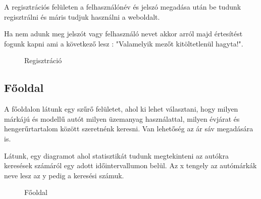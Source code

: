 A regisztrációs felületen a felhasználónév és jelszó megadása után be tudunk regisztrálni és máris tudjuk használni a weboldalt.

Ha nem adunk meg jelszót vagy felhasználó nevet akkor arról majd értesítést fogunk kapni ami a következő lesz : "Valamelyik mezőt kitöltetlenül hagyta!".

\begin{figure}[h]
\centering
{}
\caption{Regisztráció}
\label{fig:Regisztráció}
\end{figure}

\newpage
\subsection{Főoldal}

A főoldalon látunk egy szűrő felületet, ahol ki lehet választani, hogy milyen márkájú és modellű autót milyen üzemanyag használattal, milyen évjárat és hengerűrtartalom között szeretnénk keresni. Van lehetőség az ár sáv megadására is.

Látunk, egy diagramot ahol statisztikát tudunk megtekinteni az autókra keresések számáról egy adott időintervallumon belül. Az x tengely az autómárkák neve lesz az y pedig a keresési számuk.

\begin{figure}[h]
\centering
{}
\caption{Főoldal}
\label{fig:Fooldal}
\end{figure}

